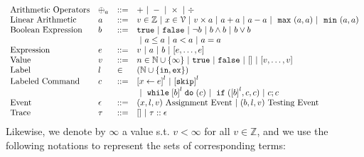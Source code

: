 \[
\begin{array}{llll}
\mbox{Arithmetic Operators} 
& \oplus_a & ::= & + ~|~ - ~|~ \times 
%
~|~ \div
\\  
\mbox{Linear Arithmetic} 
& \aexpr & ::= & 
v \in \mathbb{Z} ~|~ x \in \vardom ~|~ v \times \aexpr ~|~ \aexpr + \aexpr ~|~ \aexpr - \aexpr
  ~|~ \emax (a, a) ~|~ \emin(a, a)
\\
\mbox{Boolean Expression} & \bexpr & ::= & 
%
\etrue ~|~ \efalse  ~|~ \neg \bexpr
 ~|~ \bexpr \land \bexpr
%
~|~ \bexpr \lor \bexpr 
\\
& & &
~|~ \aexpr \leq \aexpr 
~|~ \aexpr < \aexpr 
~|~ \aexpr = \aexpr 
\\
\mbox{Expression} & \expr & ::= & v ~|~ \aexpr ~|~ \bexpr ~|~ [\expr, \dots, \expr]
\\  
%
\mbox{Value} 
& v & ::= & { n \in \mathbb{N} \cup \{\infty\} ~|~ \etrue ~|~ \efalse ~|~ [] ~|~ [v, \dots, v]} \\
%
\mbox{Label} 
& l & \in & (\mathbb{N} \cup \{\lin, \lex\}) 
\\ 
%
\mbox{Labeled Command} 
& {c} & ::= &  
\clabel{\assign{x}{\expr}}^l 
~|~  \clabel{\eskip}^l 
\\
& & &
~|~ \ewhile \clabel{\bexpr}^{l} \edo ({c})
~|~ \eif(\clabel{\bexpr}^{l} , {c}, {c}) 
~|~ {c};{c}  
\\ 
\mbox{Event} 
& \event & ::= & 
({x}, l, v) ~ \mbox{Assignment Event} 
~|~(\bexpr, l, v) ~ \mbox{Testing Event}
\\
\mbox{Trace} & \trace
& ::= & [] ~|~ \trace :: \event
\\
\end{array}
\]
Likewise, we denote by $\infty$ a value s.t. $v < \infty $ for all $v \in \mathbb{Z}$, and we use the following notations to represent the sets of corresponding terms:
